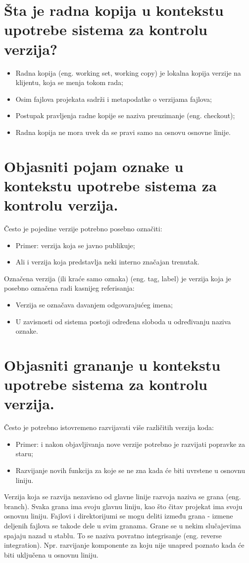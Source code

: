 \documentclass[a4paper]{article}
\begin{document}
\section{Šta je radna kopija u kontekstu upotrebe sistema za kontrolu verzija?}
  \begin{itemize}
    \item Radna kopija (eng. working set, working copy) je lokalna kopija verzije na klijentu, 
          koja se menja tokom rada;
    \item Osim fajlova projekata sadrži i metapodatke o verzijama fajlova;
    \item Postupak pravljenja radne kopije se naziva preuzimanje (eng. checkout);
    \item Radna kopija ne mora uvek da se pravi samo na osnovu osnovne linije.
  \end{itemize}
\section{Objasniti pojam oznake u kontekstu upotrebe sistema za kontrolu verzija.}
  Često je pojedine verzije potrebno posebno označiti:
  \begin{itemize}
    \item Primer: verzija koja se javno publikuje;
    \item Ali i verzija koja predstavlja neki interno značajan trenutak.
  \end{itemize}
  Označena verzija (ili kraće samo oznaka) (eng. tag, label) je verzija koja je posebno 
  označena radi kasnijeg referisanja:
  \begin{itemize}
    \item Verzija se označava davanjem odgovarajućeg imena;
    \item U zavisnosti od sistema postoji određena sloboda u određivanju naziva oznake.
  \end{itemize}
  
\section{Objasniti grananje u kontekstu upotrebe sistema za kontrolu verzija.}
  Često je potrebno istovremeno razvijavati više različitih verzija koda:
  \begin{itemize}
    \item Primer: i nakon objavljivanja nove verzije potrebno je razvijati popravke za staru;
    \item Razvijanje novih funkcija za koje se ne zna kada će biti uvrstene u osnovnu liniju.
  \end{itemize}
  Verzija koja se razvija nezavisno od glavne linije razvoja naziva se grana (eng. branch). 
  Svaka grana ima svoju glavnu liniju, kao što čitav projekat ima svoju osnovnu liniju. 
  Fajlovi i direktorijumi se mogu deliti između grana - izmene deljenih fajlova se takode dele u 
  svim granama. Grane se u nekim slučajevima spajaju nazad u stablu. To se naziva povratno 
  integrisanje (eng. reverse integration). Npr. razvijanje komponente za koju nije unapred 
  poznato kada će biti uključena u osnovnu liniju.
\end{document}
